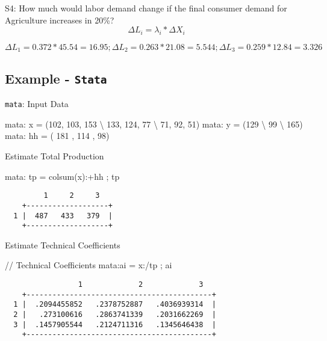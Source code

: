 \documentclass[
  letterpaper,
  DIV=11,
  numbers=noendperiod]{scrartcl}
\newenvironment{Shaded}{\begin{snugshade}}{\end{snugshade}}
\newcommand{\CommentTok}[1]{\textcolor[rgb]{0.37,0.37,0.37}{#1}}
\newcommand{\FunctionTok}[1]{\textcolor[rgb]{0.28,0.35,0.67}{#1}}
\newcommand{\KeywordTok}[1]{\textcolor[rgb]{0.00,0.23,0.31}{#1}}
\newcommand{\NormalTok}[1]{\textcolor[rgb]{0.00,0.23,0.31}{#1}}
\begin{document}
S4: How much would labor demand change if the final consumer demand for
Agriculture increases in 20\%? \[\Delta L_i = \lambda_i * \Delta X_i\]

\(\Delta L_1 = 0.372 * 45.54 = 16.95 ; \Delta L_2 = 0.263 * 21.08 = 5.544 ; \Delta L_3 = 0.259 * 12.84 = 3.326\)

\subsection{\texorpdfstring{Example -
\texttt{Stata}}{Example - Stata}}\label{example---stata}

\texttt{mata}: Input Data

\begin{Shaded}
\begin{Highlighting}[]
\KeywordTok{mata}\NormalTok{: x  = (102, 103, 153 \textbackslash{} 133, 124, 77 \textbackslash{} 71, 92, 51)}
\KeywordTok{mata}\NormalTok{: }\FunctionTok{y}\NormalTok{  = (129 \textbackslash{} 99 \textbackslash{} 165)}
\KeywordTok{mata}\NormalTok{: hh = ( 181 , 114 , 98)}
\end{Highlighting}
\end{Shaded}

Estimate Total Production

\begin{Shaded}
\begin{Highlighting}[]
\KeywordTok{mata}\NormalTok{: tp = colsum(x):+hh ; tp}
\end{Highlighting}
\end{Shaded}

\begin{verbatim}
         1     2     3
    +-------------------+
  1 |  487   433   379  |
    +-------------------+
\end{verbatim}

Estimate Technical Coefficients

\begin{Shaded}
\begin{Highlighting}[]
\CommentTok{// Technical Coefficients}
\KeywordTok{mata}\NormalTok{:ai = x:/tp ; ai}
\end{Highlighting}
\end{Shaded}

\begin{verbatim}
                 1             2             3
    +-------------------------------------------+
  1 |  .2094455852   .2378752887   .4036939314  |
  2 |   .273100616   .2863741339   .2031662269  |
  3 |  .1457905544   .2124711316   .1345646438  |
    +-------------------------------------------+
\end{verbatim}
\end{document}
